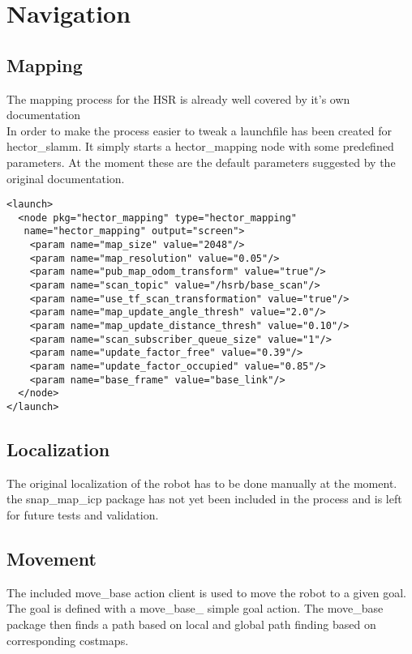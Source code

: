\documentclass[main.tex]{subfiles}
\begin{document}
	
	\chapter{Navigation}
		\section{Mapping}
		
		The mapping process for the HSR is already well covered by it's own documentation
		\ \\
		In order to make the process easier to tweak a launchfile has been created for hector\_slamm. It simply starts a hector\_mapping node with some predefined parameters. At the moment these are the default parameters suggested by the original documentation.
		
		\begin{lstlisting}
<launch>
  <node pkg="hector_mapping" type="hector_mapping"
   name="hector_mapping" output="screen">
    <param name="map_size" value="2048"/>
    <param name="map_resolution" value="0.05"/>
    <param name="pub_map_odom_transform" value="true"/>
    <param name="scan_topic" value="/hsrb/base_scan"/>
    <param name="use_tf_scan_transformation" value="true"/>
    <param name="map_update_angle_thresh" value="2.0"/>
    <param name="map_update_distance_thresh" value="0.10"/>
    <param name="scan_subscriber_queue_size" value="1"/>
    <param name="update_factor_free" value="0.39"/>
    <param name="update_factor_occupied" value="0.85"/>
    <param name="base_frame" value="base_link"/>
  </node>
</launch>
		\end{lstlisting}
		
		\section{Localization}
		The original localization of the robot has to be done manually at the moment.
		\ \\
		the snap\_map\_icp package has not yet been included in the process and is left for future tests and validation.
		
		\section{Movement}
		The included move\_base action client is used to move the robot to a given goal. The goal is defined with a move\_base\_ simple goal action. The move\_base package then finds a path based on local and global path finding based on corresponding costmaps. 
	
\end{document}
